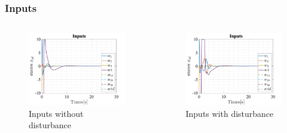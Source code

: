 \documentclass{beamer}
\begin{document}
\begin{frame}
    \frametitle{Inputs}

    \begin{columns}

        \begin{figure}[h]
            \centering
            \includegraphics[width=1\textwidth]{Inputs_T_Servo.jpg}
            \caption{Inputs without disturbance}
        \end{figure}

        \begin{figure}[h]
            \centering
            \includegraphics[width=1\textwidth]{Inputs_T_Servo_Dist.jpg}
            \caption{Inputs with disturbance}
        \end{figure}
    \end{columns}
\end{frame}
\end{document}
